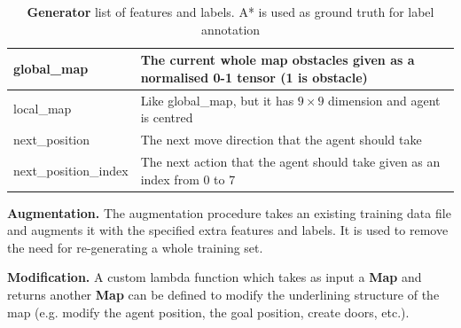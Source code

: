 \begin{table}[h!]
\begin{tabular}{|M{5cm}|M{9cm}|}
        \hline
        global\_map & The current whole map obstacles given as a normalised 0-1 tensor (1 is obstacle)\\
        \hline
        local\_map & Like global\_map, but it has $9\times9$ dimension and agent is centred \\
        \hline
        next\_position & The next move direction that the agent should take \\
        \hline
        next\_position\_index & The next action that the agent should take given as an index from 0 to 7 \\
        \hline
    \end{tabular}
    \caption{\textbf{Generator} list of features and labels. A* is used as ground truth for label annotation}
    \label{tab: gen_label_list}
\end{table}

\textbf{Augmentation.} The augmentation procedure takes an existing training data file and augments it with the specified extra features and labels. It is used to remove the need for re-generating a whole training set.

\textbf{Modification.} A custom lambda function which takes as input a \textbf{Map} and returns another \textbf{Map} can be defined to modify the underlining structure of the map (e.g. modify the agent position, the goal position, create doors, etc.).